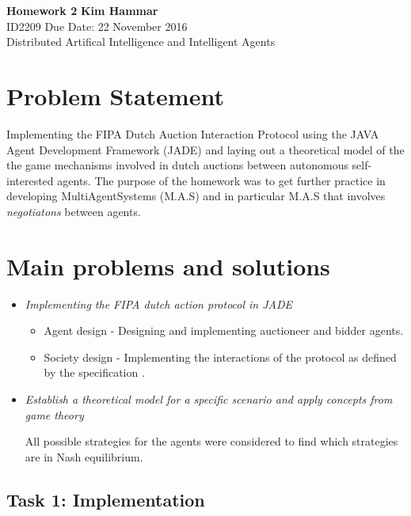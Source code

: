 \documentclass[a4paper, 11pt]{article}
\begin{document}
\noindent
\large\textbf{Homework 2} \hfill \textbf{Kim Hammar} \\
\normalsize ID2209 \hfill Due Date: 22 November 2016 \\
Distributed Artifical Intelligence and Intelligent Agents \hfill \\

\section*{Problem Statement}
Implementing the FIPA Dutch Auction Interaction Protocol \citep{fipa_dutch} using the JAVA Agent Development Framework (JADE) \citep{jade} and laying out a theoretical model of the the game mechanisms involved in dutch auctions between autonomous self-interested agents. The purpose of the homework was to get further practice in developing MultiAgentSystems (M.A.S) and in particular M.A.S that involves \textit{negotiatons} between agents.

\section*{Main problems and solutions}
\begin{itemize}
\item \textit{Implementing the FIPA dutch action protocol in JADE}
\begin{itemize}
\item Agent design - Designing and implementing auctioneer and bidder agents.
\item Society design - Implementing the interactions of the protocol as defined by the specification \citep{fipa_dutch}.
\end{itemize}
\item \textit{Establish a theoretical model for a specific scenario and apply concepts from game theory}

All possible strategies for the agents were considered to find which strategies are in Nash equilibrium.
\end{itemize}

\subsection*{Task 1: Implementation}
\end{document}
